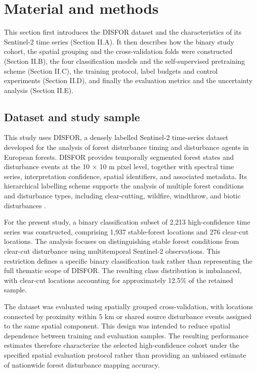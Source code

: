 \documentclass[10pt,a4paper,twocolumn]{article}
\begin{document}
\section{Material and methods}
This section first introduces the DISFOR dataset and the characteristics of its Sentinel-2 time series (Section II.A). It then describes how the binary study cohort, the spatial grouping and the cross-validation folds were constructed (Section II.B), the four classification models and the self-supervised pretraining scheme (Section II.C), the training protocol, label budgets and control experiments (Section II.D), and finally the evaluation metrics and the uncertainty analysis (Section II.E).

\subsection{Dataset and study sample}
This study uses DISFOR, a densely labelled Sentinel-2 time-series dataset developed for the analysis of forest disturbance timing and disturbance agents in European forests. DISFOR provides temporally segmented forest states and disturbance events at the 10 $\times$ 10 m pixel level, together with spectral time series, interpretation confidence, spatial identifiers, and associated metadata. Its hierarchical labelling scheme supports the analysis of multiple forest conditions and disturbance types, including clear-cutting, wildfire, windthrow, and biotic disturbances \cite{ref1}.

For the present study, a binary classification subset of 2,213 high-confidence time series was constructed, comprising 1,937 stable-forest locations and 276 clear-cut locations. The analysis focuses on distinguishing stable forest conditions from clear-cut disturbance using multitemporal Sentinel-2 observations. This restriction defines a specific binary classification task rather than representing the full thematic scope of DISFOR. The resulting class distribution is imbalanced, with clear-cut locations accounting for approximately 12.5\% of the retained sample.

The dataset was evaluated using spatially grouped cross-validation, with locations connected by proximity within 5 km or shared source disturbance events assigned to the same spatial component. This design was intended to reduce spatial dependence between training and evaluation samples. The resulting performance estimates therefore characterize the selected high-confidence cohort under the specified spatial evaluation protocol rather than providing an unbiased estimate of nationwide forest disturbance mapping accuracy.
\end{document}
